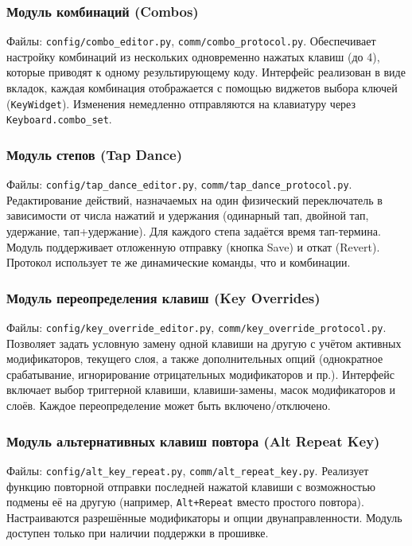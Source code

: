 \subsubsection{Модуль комбинаций (Combos)}
Файлы: \texttt{config/combo\_editor.py}, \texttt{comm/combo\_protocol.py}.
Обеспечивает настройку комбинаций из нескольких одновременно нажатых клавиш (до 4), которые приводят к одному результирующему коду. Интерфейс реализован в виде вкладок, каждая комбинация отображается с помощью виджетов выбора ключей (\texttt{KeyWidget}). Изменения немедленно отправляются на клавиатуру через \texttt{Keyboard.combo\_set}.

\subsubsection{Модуль степов (Tap Dance)}
Файлы: \texttt{config/tap\_dance\_editor.py}, \texttt{comm/tap\_dance\_protocol.py}.
Редактирование действий, назначаемых на один физический переключатель в зависимости от числа нажатий и удержания (одинарный тап, двойной тап, удержание, тап+удержание). Для каждого степа задаётся время тап-термина. Модуль поддерживает отложенную отправку (кнопка Save) и откат (Revert). Протокол использует те же динамические команды, что и комбинации.

\subsubsection{Модуль переопределения клавиш (Key Overrides)}
Файлы: \texttt{config/key\_override\_editor.py}, \texttt{comm/key\_override\_protocol.py}.
Позволяет задать условную замену одной клавиши на другую с учётом активных модификаторов, текущего слоя, а также дополнительных опций (однократное срабатывание, игнорирование отрицательных модификаторов и пр.). Интерфейс включает выбор триггерной клавиши, клавиши-замены, масок модификаторов и слоёв. Каждое переопределение может быть включено/отключено.

\subsubsection{Модуль альтернативных клавиш повтора (Alt Repeat Key)}
Файлы: \texttt{config/alt\_key\_repeat.py}, \texttt{comm/alt\_repeat\_key.py}.
Реализует функцию повторной отправки последней нажатой клавиши с возможностью подмены её на другую (например, \texttt{Alt+Repeat} вместо простого повтора). Настраиваются разрешённые модификаторы и опции двунаправленности. Модуль доступен только при наличии поддержки в прошивке.

